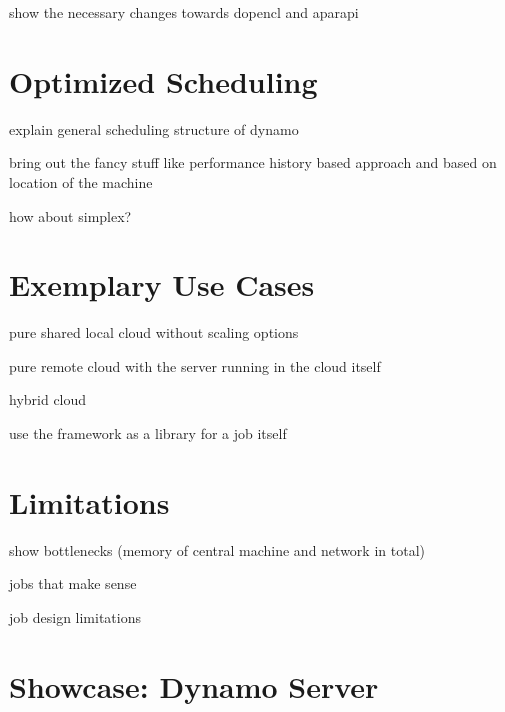 show the necessary changes towards dopencl and aparapi

\section{Optimized Scheduling}

explain general scheduling structure of dynamo

bring out the fancy stuff like performance history based approach and based on location of the machine

how about simplex?

\section{Exemplary Use Cases}

pure shared local cloud without scaling options

pure remote cloud with the server running in the cloud itself

hybrid cloud

use the framework as a library for a job itself
\section{Limitations}

show bottlenecks (memory of central machine and network in total)

jobs that make sense

job design limitations

\section{Showcase: Dynamo Server}
